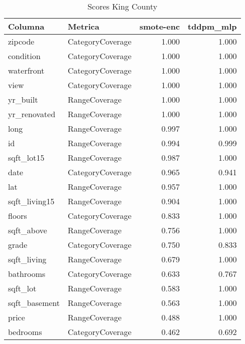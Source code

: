 \begin{table}[H]
\centering
\caption{Scores King County}
\label{table-coverage-king county-a-2}
\begin{tabular}{|l|l|r|r|}
\hline
\rowcolor[gray]{0.8}
Columna & Metrica & smote-enc & tddpm\_mlp \\
\hline zipcode & CategoryCoverage & \cellcolor[HTML]{EEEEEE} 1.000 & \cellcolor[HTML]{EEEEEE} 1.000 \\
\hline condition & CategoryCoverage & \cellcolor[HTML]{EEEEEE} 1.000 & \cellcolor[HTML]{EEEEEE} 1.000 \\
\hline waterfront & CategoryCoverage & \cellcolor[HTML]{EEEEEE} 1.000 & \cellcolor[HTML]{EEEEEE} 1.000 \\
\hline view & CategoryCoverage & \cellcolor[HTML]{EEEEEE} 1.000 & \cellcolor[HTML]{EEEEEE} 1.000 \\
\hline yr\_built & RangeCoverage & 1.000 & \cellcolor[HTML]{EEEEEE} 1.000 \\
\hline yr\_renovated & RangeCoverage & 1.000 & \cellcolor[HTML]{EEEEEE} 1.000 \\
\hline long & RangeCoverage & 0.997 & \cellcolor[HTML]{EEEEEE} 1.000 \\
\hline id & RangeCoverage & 0.994 & \cellcolor[HTML]{EEEEEE} 0.999 \\
\hline sqft\_lot15 & RangeCoverage & 0.987 & \cellcolor[HTML]{EEEEEE} 1.000 \\
\hline date & CategoryCoverage & \cellcolor[HTML]{EEEEEE} 0.965 & 0.941 \\
\hline lat & RangeCoverage & 0.957 & \cellcolor[HTML]{EEEEEE} 1.000 \\
\hline sqft\_living15 & RangeCoverage & 0.904 & \cellcolor[HTML]{EEEEEE} 1.000 \\
\hline floors & CategoryCoverage & 0.833 & \cellcolor[HTML]{EEEEEE} 1.000 \\
\hline sqft\_above & RangeCoverage & 0.756 & \cellcolor[HTML]{EEEEEE} 1.000 \\
\hline grade & CategoryCoverage & 0.750 & \cellcolor[HTML]{EEEEEE} 0.833 \\
\hline sqft\_living & RangeCoverage & 0.679 & \cellcolor[HTML]{EEEEEE} 1.000 \\
\hline bathrooms & CategoryCoverage & 0.633 & \cellcolor[HTML]{EEEEEE} 0.767 \\
\hline sqft\_lot & RangeCoverage & 0.583 & \cellcolor[HTML]{EEEEEE} 1.000 \\
\hline sqft\_basement & RangeCoverage & 0.563 & \cellcolor[HTML]{EEEEEE} 1.000 \\
\hline price & RangeCoverage & 0.488 & \cellcolor[HTML]{EEEEEE} 1.000 \\
\hline bedrooms & CategoryCoverage & 0.462 & \cellcolor[HTML]{EEEEEE} 0.692 \\
\hline
\end{tabular}
\end{table}
